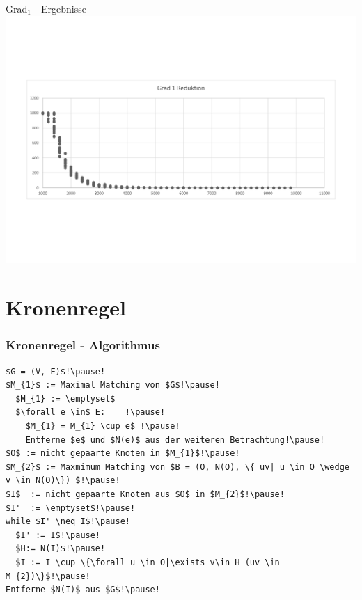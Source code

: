 \documentclass{beamer}
\begin{document}
\begin{frame}{Grad$_{1}$ - Ergebnisse}
\includegraphics[scale= .4]{analysisOne.pdf} 
\end{frame}

\section{Kronenregel}
\begin{frame}[fragile]
\frametitle{Kronenregel - Algorithmus}
\begin{lstlisting}[mathescape=true, escapechar = !,basicstyle=\ttfamily\scriptsize]
$G = (V, E)$!\pause!
$M_{1}$ := Maximal Matching von $G$!\pause!
  $M_{1} := \emptyset$
  $\forall e \in$ E:	!\pause!
    $M_{1} = M_{1} \cup e$ !\pause!
    Entferne $e$ und $N(e)$ aus der weiteren Betrachtung!\pause!
$O$ := nicht gepaarte Knoten in $M_{1}$!\pause!
$M_{2}$ := Maxmimum Matching von $B = (O, N(O), \{ uv| u \in O \wedge v \in N(O)\}) $!\pause!
$I$  := nicht gepaarte Knoten aus $O$ in $M_{2}$!\pause!
$I'  := \emptyset$!\pause!
while $I' \neq I$!\pause!
  $I' := I$!\pause!
  $H:= N(I)$!\pause!
  $I := I \cup \{\forall u \in O|\exists v\in H (uv \in M_{2})\}$!\pause!
Entferne $N(I)$ aus $G$!\pause!
\end{lstlisting}
\end{frame}
\end{document}
